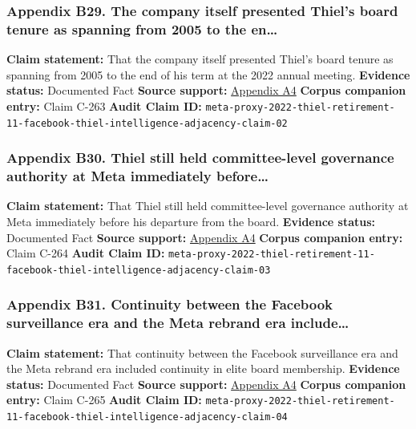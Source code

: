 \documentclass[
  american,
  11pt,
  letterpaper,
]{article}
\begin{document}
\subsubsection{Appendix B29. The company itself presented Thiel's board
tenure as spanning from 2005 to the
en\ldots{}}\label{appendix-b29-the-company-itself-presented-thiel-s-board-tenure-as-spanning-from-2005-to-the-en}

\textbf{Claim statement:} That the company itself presented Thiel's
board tenure as spanning from 2005 to the end of his term at the 2022
annual meeting. \textbf{Evidence status:} Documented Fact \textbf{Source
support:}
\hyperref[appendix-a4-meta-platforms-inc-2022-definitive-proxy-statement]{Appendix
A4} \textbf{Corpus companion entry:} Claim C-263 \textbf{Audit Claim
ID:}
\texttt{meta-proxy-2022-thiel-retirement-11-facebook-thiel-intelligence-adjacency-claim-02}

\subsubsection{Appendix B30. Thiel still held committee-level governance
authority at Meta immediately
before\ldots{}}\label{appendix-b30-thiel-still-held-committee-level-governance-authority-at-meta-immediately-before}

\textbf{Claim statement:} That Thiel still held committee-level
governance authority at Meta immediately before his departure from the
board. \textbf{Evidence status:} Documented Fact \textbf{Source
support:}
\hyperref[appendix-a4-meta-platforms-inc-2022-definitive-proxy-statement]{Appendix
A4} \textbf{Corpus companion entry:} Claim C-264 \textbf{Audit Claim
ID:}
\texttt{meta-proxy-2022-thiel-retirement-11-facebook-thiel-intelligence-adjacency-claim-03}

\subsubsection{Appendix B31. Continuity between the Facebook
surveillance era and the Meta rebrand era
include\ldots{}}\label{appendix-b31-continuity-between-the-facebook-surveillance-era-and-the-meta-rebrand-era-include}

\textbf{Claim statement:} That continuity between the Facebook
surveillance era and the Meta rebrand era included continuity in elite
board membership. \textbf{Evidence status:} Documented Fact
\textbf{Source support:}
\hyperref[appendix-a4-meta-platforms-inc-2022-definitive-proxy-statement]{Appendix
A4} \textbf{Corpus companion entry:} Claim C-265 \textbf{Audit Claim
ID:}
\texttt{meta-proxy-2022-thiel-retirement-11-facebook-thiel-intelligence-adjacency-claim-04}
\end{document}

